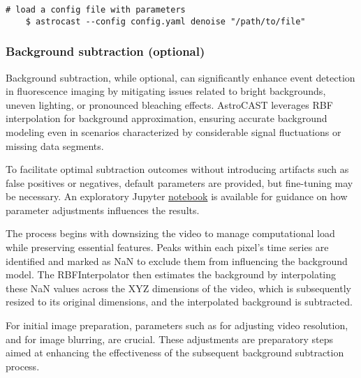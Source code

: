 \begin{lstlisting}[style=bashStyle]
    # load a config file with parameters
    $ astrocast --config config.yaml denoise "/path/to/file"
\end{lstlisting}


\subsubsection{Background subtraction (optional)}
\label{subsubsec:background}

Background subtraction, while optional, can significantly enhance event detection in fluorescence imaging by mitigating issues related to bright backgrounds, uneven lighting, or pronounced bleaching effects. AstroCAST leverages \ac{RBF} interpolation for background approximation, ensuring accurate background modeling even in scenarios characterized by considerable signal fluctuations or missing data segments.

To facilitate optimal subtraction outcomes without introducing artifacts such as false positives or negatives, default parameters are provided, but fine-tuning may be necessary. An exploratory Jupyter \href{https://github.com/janreising/astroCAST/blob/8451394bc0d810c4037011f0bcb9cba1f10d1e72/notebooks/dev/exploring_delta.ipynb}{notebook} is available for guidance on how parameter adjustments influences the results.

The process begins with downsizing the video to manage computational load while preserving essential features. Peaks within each pixel's time series are identified and marked as NaN to exclude them from influencing the background model. The RBFInterpolator then estimates the background by interpolating these NaN values across the XYZ dimensions of the video, which is subsequently resized to its original dimensions, and the interpolated background is subtracted.

For initial image preparation, parameters such as  for adjusting video resolution,  and  for image blurring, are crucial. These adjustments are preparatory steps aimed at enhancing the effectiveness of the subsequent background subtraction process.

